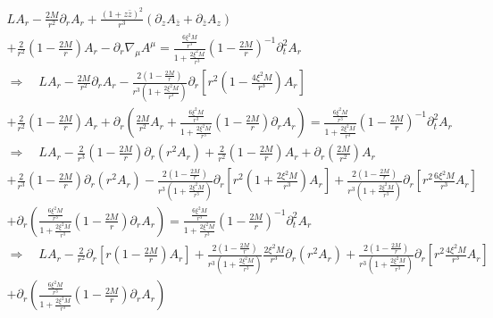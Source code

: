 \documentclass[12pt]{article}
\def\nn{\nonumber}
\begin{document}
\begin{gather}
L A_{r} 
-
\frac{2 M}{r^{2}}
\partial_{r} A_{r}
+
\frac{(1 + z \bar{z})^{2}}{r^{3}}
(\partial_{z} A_{\bar{z}} + \partial_{\bar{z}} A_{z})
\nn \\
+
\frac{2}{r^{2}}
(1 - \frac{2 M}{r})
A_{r}
-
\partial_{r}
\nabla_{\mu}
A^{\mu}
=
\frac{\frac{6 \xi^{2} M}{r^{3}} }{1 + \frac{2 \xi^{2} M}{r^{3}}}
(1 - \frac{2 M}{r})^{-1}
\partial_{t}^{2} A_{r} 
\nn \\
\Rightarrow
\quad
L A_{r} 
-
\frac{2 M}{r^{2}}
\partial_{r} A_{r}
-
\frac{2 (1 - \frac{2 M}{r})}{r^{3} (1 + \frac{2 \xi^{2} M}{r^{3}})}
\partial_{r}
\left[
r^{2}
(1 - \frac{4 \xi^{2} M}{r^{3}})
A_{r}
\right]
\nn \\
+
\frac{2}{r^{2}}
(1 - \frac{2 M}{r})
A_{r}
+
\partial_{r}
\left(
\frac{2 M}{r^{2}}A_{r}
+
\frac{\frac{6 \xi^{2} M}{r^{3}} }{1 + \frac{2 \xi^{2} M}{r^{3}}}
(1 - \frac{2 M}{r})
\partial_{r} A_{r}
\right)
=
\frac{\frac{6 \xi^{2} M}{r^{3}} }{1 + \frac{2 \xi^{2} M}{r^{3}}}
(1 - \frac{2 M}{r})^{-1}
\partial_{t}^{2} A_{r} 
\nn \\
\Rightarrow
\quad
L A_{r}
-
\frac{2}{r^{3}}
(1 - \frac{2 M}{r})
\partial_{r}
\left(
r^{2}
A_{r}
\right)
+
\frac{2}{r^{2}}
(1 - \frac{2 M}{r})
A_{r}
+
\partial_{r}
\left(
\frac{2 M}{r^{2}}
\right)
A_{r}
\nn \\
+
\frac{2}{r^{3}}
(1 - \frac{2 M}{r})
\partial_{r}
\left(
r^{2}
A_{r}
\right)
-
\frac{2 (1 - \frac{2 M}{r})}{r^{3} (1 + \frac{2 \xi^{2} M}{r^{3}})}
\partial_{r}
\left[
r^{2}
(1 + \frac{2 \xi^{2} M}{r^{3}})
A_{r}
\right]
+
\frac{2 (1 - \frac{2 M}{r})}{r^{3} (1 + \frac{2 \xi^{2} M}{r^{3}})}
\partial_{r}
\left[
r^{2}
\frac{6 \xi^{2} M}{r^{3}}
A_{r}
\right]
\nn \\
+
\partial_{r}
\left(
\frac{\frac{6 \xi^{2} M}{r^{3}} }{1 + \frac{2 \xi^{2} M}{r^{3}}}
(1 - \frac{2 M}{r})
\partial_{r} A_{r}
\right)
=
\frac{\frac{6 \xi^{2} M}{r^{3}} }{1 + \frac{2 \xi^{2} M}{r^{3}}}
(1 - \frac{2 M}{r})^{-1}
\partial_{t}^{2} A_{r} 
\nn \\
\Rightarrow
\quad
L A_{r}
-
\frac{2}{r^{2}}
\partial_{r}
\left[
r
(1 - \frac{2 M}{r})
A_{r}
\right]
+
\frac{2 (1 - \frac{2 M}{r})}{r^{3} (1 + \frac{2 \xi^{2} M}{r^{3}})}
\frac{2 \xi^{2} M}{r^{3}}
\partial_{r}
\left(
r^{2}
A_{r}
\right)
+
\frac{2 (1 - \frac{2 M}{r})}{r^{3} (1 + \frac{2 \xi^{2} M}{r^{3}})}
\partial_{r}
\left[
r^{2}
\frac{4 \xi^{2} M}{r^{3}}
A_{r}
\right]
\nn \\
+
\partial_{r}
\left(
\frac{\frac{6 \xi^{2} M}{r^{3}} }{1 + \frac{2 \xi^{2} M}{r^{3}}}
(1 - \frac{2 M}{r})
\partial_{r} A_{r}
\right)

\end{gather}
\end{document}
